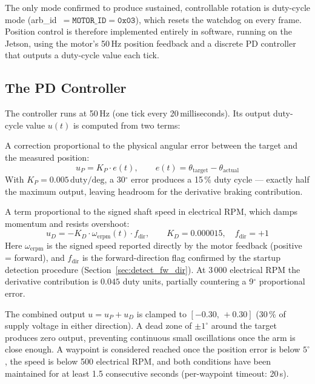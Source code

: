 \documentclass[12pt,a4paper]{article}
\begin{document}
The only mode confirmed to produce sustained, controllable rotation is
duty-cycle mode (arb\_id~$= \texttt{MOTOR\_ID} = \texttt{0x03}$),
which resets the watchdog on every frame.  Position control is therefore
implemented entirely in software, running on the Jetson, using the
motor's 50\,Hz position feedback and a discrete PD controller that
outputs a duty-cycle value each tick.

\subsection{The PD Controller}

The controller runs at 50\,Hz (one tick every 20\,milliseconds).  Its
output duty-cycle value $u(t)$ is computed from two terms:

\begin{description}[leftmargin=3.8cm, style=nextline]
  \item[Proportional]
    A correction proportional to the physical angular error between the
    target and the measured position:
    \begin{equation}
      u_P = K_P \cdot e(t), \qquad e(t) = \theta_{\text{target}} - \theta_{\text{actual}}
    \end{equation}
    With $K_P = 0.005\,\text{duty}/\text{deg}$, a 30$^\circ$ error
    produces a 15\,\% duty cycle --- exactly half the maximum output,
    leaving headroom for the derivative braking contribution.

  \item[Derivative (speed-damping term)]
    A term proportional to the signed shaft speed in electrical RPM,
    which damps momentum and resists overshoot:
    \begin{equation}
      u_D = -K_D \cdot \omega_{\text{erpm}}(t) \cdot f_{\text{dir}},
      \qquad K_D = 0.000015,\quad f_{\text{dir}} = +1
    \end{equation}
    Here $\omega_{\text{erpm}}$ is the signed speed reported directly
    by the motor feedback (positive = forward), and $f_{\text{dir}}$
    is the forward-direction flag confirmed by the startup detection
    procedure (Section~\ref{sec:detect_fw_dir}).  At
    3\,000 electrical RPM the derivative contribution is $0.045$ duty
    units, partially countering a 9$^\circ$ proportional error.
\end{description}

The combined output $u = u_P + u_D$ is clamped to
$[-0.30,\,+0.30]$ (30\,\% of supply voltage in either direction).
A dead zone of $\pm 1^\circ$ around the target produces zero output,
preventing continuous small oscillations once the arm is close enough.
A waypoint is considered reached once the position error is below
$5^\circ$, the speed is below 500 electrical RPM, and both conditions
have been maintained for at least 1.5 consecutive seconds
(per-waypoint timeout: 20\,s).
\end{document}
